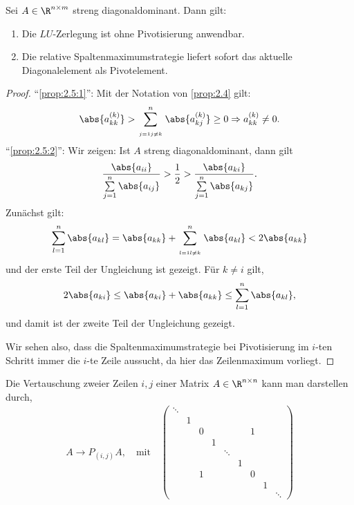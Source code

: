 \begin{cor}
\label{prop:2.5}
Sei $A\in\R^{n\times m}$ streng diagonaldominant. Dann gilt:
\begin{enumerate}[label=(\roman{*})]
  \item\label{prop:2.5:1} Die $LU$-Zerlegung ist ohne Pivotisierung anwendbar.
  \item\label{prop:2.5:2} Die relative Spaltenmaximumstrategie liefert sofort
  das aktuelle Diagonalelement als Pivotelement.\fishhere
\end{enumerate}
\end{cor}
\begin{proof}
``\ref{prop:2.5:1}'': Mit der Notation von \ref{prop:2.4} gilt:
\begin{align*}
\abs{a_{kk}^{(k)}} > \sum\limits_{\atop{j=1}{j\neq k}}^n \abs{a_{kj}^{(k)}} \ge
0 \Rightarrow a_{kk}^{(k)} \neq 0.
\end{align*}
``\ref{prop:2.5:2}'': Wir zeigen: Ist $A$ streng diagonaldominant, dann gilt
\begin{align*}
\frac{\abs{a_{ii}}}{\sum\limits_{j=1}^n \abs{a_{ij}}} >
\frac{1}{2} > 
\frac{\abs{a_{ki}}}{\sum\limits_{j=1}^n \abs{a_{kj}}}. 
\end{align*} 
Zunächst gilt:
\begin{align*}
\sum\limits_{l=1}^n \abs{a_{kl}} = \abs{a_{kk}} +
\sum\limits_{\atop{l=1}{l\neq k}}^n \abs{a_{kl}}< 2 \abs{a_{kk}}
\end{align*}
und der erste Teil der Ungleichung ist gezeigt.
Für $k\neq i$ gilt,
\begin{align*}
2\abs{a_{ki}} \le \abs{a_{ki}} + \abs{a_{kk}}
\le \sum\limits_{l=1}^n \abs{a_{kl}}, 
\end{align*}
und damit ist der zweite Teil der Ungleichung gezeigt.

Wir sehen also, dass die Spaltenmaximumstrategie bei Pivotisierung im
$i$-ten Schritt immer die $i$-te Zeile aussucht, da hier das
Zeilenmaximum vorliegt.\qedhere
\end{proof}
Die Vertauschung zweier Zeilen $i,j$ einer Matrix $A\in\R^{n\times n}$ kann man
darstellen durch,
\begin{align*}
A\to P_{(i,j)}A,\quad
\text{mit}\quad
\begin{pmatrix}
  \ddots \\
  & 1\\
  & & 0 & & & & 1\\
  & & & 1 \\
  & & & & \ddots\\
  & & & & & 1\\
  & & 1 & & & & 0 \\
  & & & & & & & 1 \\
  & & & & & & & & \ddots
\end{pmatrix}
\end{align*}
